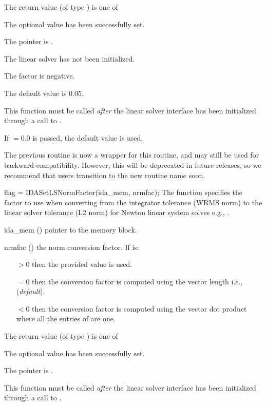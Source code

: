 {{\begin{args}
  \end{args}
}
{
  The return value  (of type ) is one of
  \begin{args}
  \item[\Id{IDALS\_SUCCESS}]
    The optional value has been successfully set.
  \item[\Id{IDALS\_MEM\_NULL}]
    The  pointer is .
  \item[\Id{IDALS\_LMEM\_NULL}]
    The {\idals} linear solver has not been initialized.
  \item[\Id{IDALS\_ILL\_INPUT}]
    The factor  is negative.
  \end{args}
}
{
  The default value is $0.05$.

  This function must be called \emph{after} the {\idals} linear solver
  interface has been initialized through a call to
  .

  If $ = 0.0$ is passed, the default value is used.

  The previous routine  is now a wrapper for this
  routine, and may still be used for backward-compatibility.  However,
  this will be deprecated in future releases, so we recommend that
  users transition to the new routine name soon.
}
{
  flag = IDASetLSNormFactor(ida\_mem, nrmfac);
}
{
  The function  specifies the factor to use when
  converting from the integrator tolerance (WRMS norm) to the linear solver
  tolerance (L2 norm) for Newton linear system solves e.g.,
  .
}
{
  \begin{args}
  \item[ida\_mem] ()
    pointer to the {\ida} memory block.
  \item[nrmfac] ()
    the norm conversion factor. If  is:
    \begin{itemize}
    \item[$> 0$] then the provided value is used.
    \item[$= 0$] then the conversion factor is computed using the vector length
      i.e.,  (\textit{default}).
    \item[$< 0$] then the conversion factor is computed using the vector dot
      product  where all the entries of  are
      one.
    \end{itemize}
  \end{args}
}
{
  The return value  (of type ) is one of
  \begin{args}
  \item[\Id{IDA\_SUCCESS}]
    The optional value has been successfully set.
  \item[\Id{IDA\_MEM\_NULL}]
    The  pointer is .
  \end{args}
}
{
  This function must be called \emph{after} the {\idals} linear solver
  interface has been initialized through a call to
  .

}}
